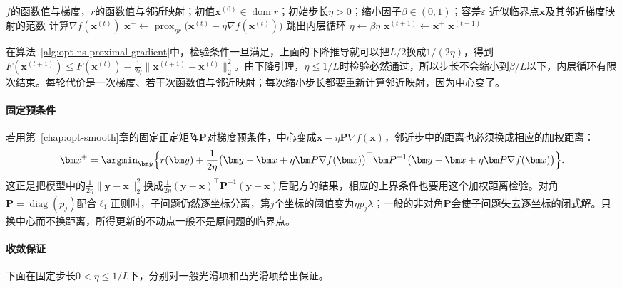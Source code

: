 \begin{algorithm}[带回溯的邻近梯度法]
  \label{alg:opt-ns-proximal-gradient}
  \begin{algorithmic}[1]
    \Require $f$的函数值与梯度，$r$的函数值与邻近映射；初值$\bm x^{(0)}\in\operatorname{dom}r$；初始步长$\eta>0$；缩小因子$\beta\in(0,1)$；容差$\varepsilon$
    \Ensure 近似临界点$\bm x$及其邻近梯度映射的范数
      \State 计算$\nabla f(\bm x^{(t)})$
      \Loop
        \State $\bm x^+\gets\operatorname{prox}_{\eta r}\bigl(\bm x^{(t)}-\eta\nabla f(\bm x^{(t)})\bigr)$
          \State 跳出内层循环
        \EndIf
        \State $\eta\gets\beta\eta$
      \EndLoop
      \State $\bm x^{(t+1)}\gets\bm x^+$
        \State \Return $\bm x^{(t+1)}$
      \EndIf
    \EndFor
  \end{algorithmic}
\end{algorithm}

在算法~\ref{alg:opt-ns-proximal-gradient}中，检验条件一旦满足，上面的下降推导就可以把$L/2$换成$1/(2\eta)$，得到$F(\bm x^{(t+1)})\leq F(\bm x^{(t)})-\frac1{2\eta}\lVert\bm x^{(t+1)}-\bm x^{(t)}\rVert_2^2$。由下降引理，$\eta\leq1/L$时检验必然通过，所以步长不会缩小到$\beta/L$以下，内层循环有限次结束。每轮代价是一次梯度、若干次函数值与邻近映射；每次缩小步长都要重新计算邻近映射，因为中心变了。

\paragraph{固定预条件}
若用第~\ref{chap:opt-smooth}章的固定正定矩阵$\bm P$对梯度预条件，中心变成$\bm x-\eta\bm P\nabla f(\bm x)$，邻近步中的距离也必须换成相应的加权距离：
\[
 \bm x^+=\argmin_{\bm y}\Bigl\{r(\bm y)+\frac1{2\eta}\bigl(\bm y-\bm x+\eta\bm P\nabla f(\bm x)\bigr)^\top\bm P^{-1}\bigl(\bm y-\bm x+\eta\bm P\nabla f(\bm x)\bigr)\Bigr\}.
\]
这正是把模型中的$\frac1{2\eta}\lVert\bm y-\bm x\rVert_2^2$换成$\frac1{2\eta}(\bm y-\bm x)^\top\bm P^{-1}(\bm y-\bm x)$后配方的结果，相应的上界条件也要用这个加权距离检验。对角$\bm P=\operatorname{diag}(p_j)$配合$\ell_1$正则时，子问题仍然逐坐标分离，第$j$个坐标的阈值变为$\eta p_j\lambda$；一般的非对角$\bm P$会使子问题失去逐坐标的闭式解。只换中心而不换距离，所得更新的不动点一般不是原问题的临界点。

\paragraph{收敛保证}
下面在固定步长$0<\eta\leq1/L$下，分别对一般光滑项和凸光滑项给出保证。

